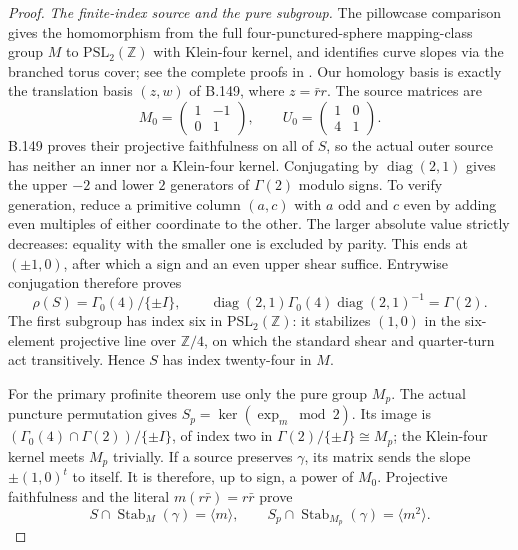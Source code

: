\begin{proof}
\emph{The finite-index source and the pure subgroup.}
The pillowcase comparison gives the homomorphism from the full
four-punctured-sphere mapping-class group $M$ to
$\mathrm{PSL}_2(\mathbb Z)$ with Klein-four kernel, and identifies
curve slopes via the branched torus cover; see the complete proofs in
\cite[\S2.2.5, pp.~57--60, Propositions~2.6--2.7]{CEFarbMargalit2011}.
Our homology basis is exactly the translation basis $(z,w)$ of B.149,
where $z=\bar r r$. The source matrices are
\[
 M_0=\begin{pmatrix}1&-1\\0&1\end{pmatrix},\qquad
 U_0=\begin{pmatrix}1&0\\4&1\end{pmatrix}.
\]
B.149 proves their projective faithfulness on all of $S$, so the actual
outer source has neither an inner nor a Klein-four kernel.
Conjugating by $\operatorname{diag}(2,1)$ gives the upper $-2$ and
lower $2$ generators of $\Gamma(2)$ modulo signs. To verify generation,
reduce a primitive column $(a,c)$ with $a$ odd and $c$ even by adding
even multiples of either coordinate to the other. The larger absolute
value strictly decreases: equality with the smaller one is excluded
by parity. This ends at $(\pm1,0)$, after which a sign and an even
upper shear suffice. Entrywise conjugation therefore proves
\[
 \rho(S)=\Gamma_0(4)/\{\pm I\},\qquad
 \operatorname{diag}(2,1)\Gamma_0(4)\operatorname{diag}(2,1)^{-1}
 =\Gamma(2).
\]
The first subgroup has index six in $\mathrm{PSL}_2(\mathbb Z)$:
it stabilizes $(1,0)$ in the six-element projective line over
$\mathbb Z/4$, on which the standard shear and quarter-turn act
transitively. Hence $S$ has index twenty-four in $M$.

For the primary profinite theorem use only the pure group $M_p$.
The actual puncture permutation gives
$S_p=\ker(\operatorname{exp}_m\bmod2)$.
Its image is $(\Gamma_0(4)\cap\Gamma(2))/\{\pm I\}$, of index two in
$\Gamma(2)/\{\pm I\}\cong M_p$; the Klein-four kernel meets $M_p$
trivially. If a source preserves $\gamma$, its matrix sends the slope
$\pm(1,0)^t$ to itself. It is therefore, up to sign, a power of $M_0$.
Projective faithfulness and the literal $m(r\bar r)=r\bar r$ prove
\begin{equation}\label{eq:B153-discrete-stabilizer}
 S\cap\operatorname{Stab}_M(\gamma)=\langle m\rangle,
 \qquad S_p\cap\operatorname{Stab}_{M_p}(\gamma)=\langle m^2\rangle.
\end{equation}


\end{proof}
